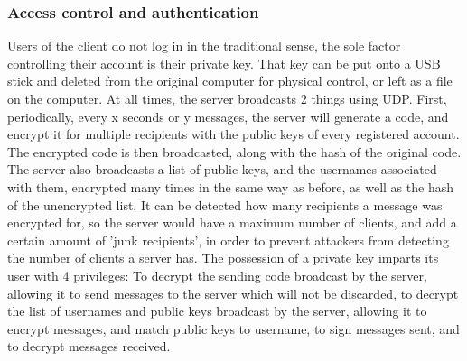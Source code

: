 \documentclass{article}
\begin{document}
\subsubsection{Access control and authentication}
Users of the client do not log in in the traditional sense, the sole factor controlling their account is their private key. That key can be put onto a USB stick and deleted from the original computer for physical control, or left as a file on the computer. At all times, the server broadcasts 2 things using UDP. First, periodically, every x seconds or y messages, the server will generate a code, and encrypt it for multiple recipients with the public keys of every registered account. The encrypted code is then broadcasted, along with the hash of the original code. The server also broadcasts a list of public keys, and the usernames associated with them, encrypted many times in the same way as before, as well as the hash of the unencrypted list. It can be detected how many recipients a message was encrypted for, so the server would have a maximum number of clients, and add a certain amount of 'junk recipients', in order to prevent attackers from detecting the number of clients a server has. The possession of a private key imparts its user with 4 privileges: To decrypt the sending code broadcast by the server, allowing it to send messages to the server which will not be discarded, to decrypt the list of usernames and public keys broadcast by the server, allowing it to encrypt messages, and match public keys to username, to sign messages sent, and to decrypt messages received.
\end{document}
